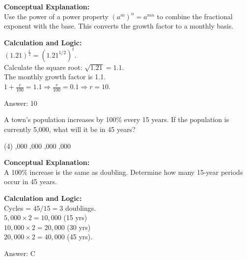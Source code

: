\documentclass[11pt,paper=a4,answers]{exam}
\begin{document}
\begin{questions}
\begin{solution}
\textbf{Conceptual Explanation:} \\
Use the power of a power property $(a^m)^n = a^{mn}$ to combine the fractional exponent with the base. This converts the growth factor to a monthly basis.

\vspace{20pt}

\textbf{Calculation and Logic:} \\
$(1.21)^{\frac{t}{2}} = (1.21^{1/2})^t$. \\
Calculate the square root: $\sqrt{1.21} = 1.1$. \\
The monthly growth factor is 1.1. \\
$1 + \frac{r}{100} = 1.1 \Rightarrow \frac{r}{100} = 0.1 \Rightarrow r = 10$.

\vspace{25pt}

Answer: \colorbox{yellow!100}{10}
\end{solution}

\vspace{40pt}

\question
A town's population increases by 100\% every 15 years. If the population is currently 5,000, what will it be in 45 years?
\begin{tasks}(4)
    ,000
    ,000
    ,000
    ,000
\end{tasks}

\begin{solution}
\textbf{Conceptual Explanation:} \\
A 100\% increase is the same as doubling. Determine how many 15-year periods occur in 45 years.

\vspace{20pt}

\textbf{Calculation and Logic:} \\
Cycles = $45 / 15 = 3$ doublings. \\
$5,000 \times 2 = 10,000$ (15 yrs) \\
$10,000 \times 2 = 20,000$ (30 yrs) \\
$20,000 \times 2 = 40,000$ (45 yrs).

\vspace{25pt}

Answer: \colorbox{yellow!100}{C}
\end{solution}


\end{questions}
\end{document}
